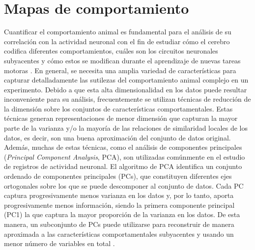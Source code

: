 \chapter{Mapas de comportamiento}\label{cha:mapas_comportamiento}



\clearpage

Cuantificar el comportamiento animal es fundamental para el análisis de su correlación con la actividad neuronal con el fin de estudiar cómo el cerebro codifica diferentes comportamientos, cuáles son los circuitos neuronales subyacentes y cómo estos se modifican durante el aprendizaje de nuevas tareas motoras \cite{esposito_defensive, levy_representation}. En general, se necesita una amplia variedad de características para capturar detalladamente las sutilezas del comportamiento animal complejo en un experimento. Debido a que esta alta dimensionalidad en los datos puede resultar inconveniente para su análisis, frecuentemente se utilizan técnicas de reducción de la dimensión sobre los conjuntos de características comportamentales. Estas técnicas generan representaciones de menor dimensión que capturan la mayor parte de la varianza y/o la mayoría de las relaciones de similaridad locales de los datos, es decir, son una buena aproximación del conjunto de datos original. Además, muchas de estas técnicas, como el análisis de componentes principales (\textit{Principal Component Analysis}, PCA), son utilizadas comúnmente en el estudio de registros de actividad neuronal. El algoritmo de PCA identifica un conjunto ordenado de componentes principales (PCs), que constituyen diferentes ejes ortogonales sobre los que se puede descomponer al conjunto de datos. Cada PC captura progresivamente menos varianza en los datos y, por lo tanto, aporta progresivamente menos información, siendo la primera componente principal (PC1) la que captura la mayor proporción de la varianza en los datos. De esta manera, un subconjunto de PCs puede utilizarse para reconstruir de manera aproximada a las características comportamentales subyacentes y usando un menor número de variables en total \cite{datta_computational_neuroethology}.

